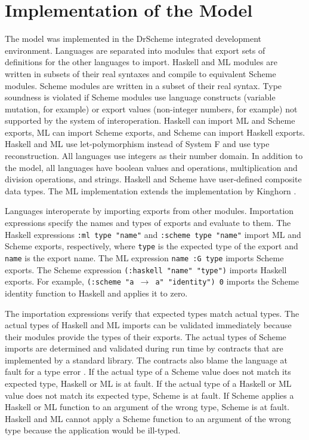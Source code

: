 \chapter{Implementation of the Model}

The model was implemented in the DrScheme integrated development environment.  Languages are separated into modules that export sets of definitions for the other languages to import.  Haskell and ML modules are written in subsets of their real syntaxes and compile to equivalent Scheme modules.  Scheme modules are written in a subset of their real syntax.  Type soundness is violated if Scheme modules use language constructs (variable mutation, for example) or export values (non-integer numbers, for example) not supported by the system of interoperation.  Haskell can import ML and Scheme exports, ML can import Scheme exports, and Scheme can import Haskell exports.  Haskell and ML use let-polymorphism instead of System F and use type reconstruction.  All languages use integers as their number domain.  In addition to the model, all languages have boolean values and operations, multiplication and division operations, and strings.  Haskell and Scheme have user-defined composite data types.  The ML implementation extends the implementation by Kinghorn \cite{kinghorn07}.

Languages interoperate by importing exports from other modules.  Importation expressions specify the names and types of exports and evaluate to them.  The Haskell expressions \texttt{:ml type "name"} and \texttt{:scheme type "name"} import ML and Scheme exports, respectively, where \texttt{type} is the expected type of the export and \texttt{name} is the export name.  The ML expression \texttt{name :G type} imports Scheme exports.  The Scheme expression \texttt{(:haskell "name" "type")} imports Haskell exports.  For example, \texttt{(:scheme "a $\rightarrow$ a" "identity") 0} imports the Scheme identity function to Haskell and applies it to zero.

The importation expressions verify that expected types match actual types.  The actual types of Haskell and ML imports can be validated immediately because their modules provide the types of their exports.  The actual types of Scheme imports are determined and validated during run time by contracts \cite{findler02} that are implemented by a standard library.  The contracts also blame the language at fault for a type error \cite{findler02}.  If the actual type of a Scheme value does not match its expected type, Haskell or ML is at fault.  If the actual type of a Haskell or ML value does not match its expected type, Scheme is at fault.  If Scheme applies a Haskell or ML function to an argument of the wrong type, Scheme is at fault.  Haskell and ML cannot apply a Scheme function to an argument of the wrong type because the application would be ill-typed.